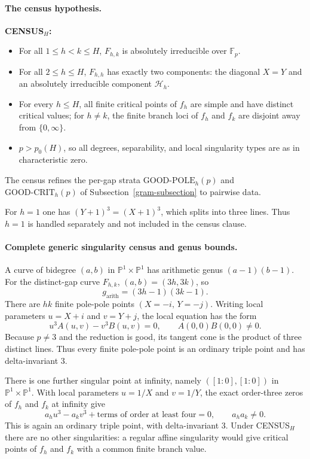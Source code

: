 \paragraph{The census hypothesis.}
\textbf{CENSUS$_H$:}
\begin{itemize}
\item For all $1\le h<k\le H$, $F_{h,k}$ is absolutely irreducible over
$\mathbb F_p$.
\item For all $2\le h\le H$, $F_{h,h}$ has exactly two components:
the diagonal $X=Y$ and an absolutely irreducible component
$\mathcal H_h$.
\item For every $h\le H$, all finite critical points of $f_h$ are
simple and have distinct critical values; for $h\ne k$, the finite
branch loci of $f_h$ and $f_k$ are disjoint away from $\{0,\infty\}$.
\item $p>p_0(H)$, so all degrees, separability, and local singularity
types are as in characteristic zero.
\end{itemize}
The census refines the per-gap strata
$\mathrm{GOOD\mbox{-}POLE}_h(p)$ and
$\mathrm{GOOD\mbox{-}CRIT}_h(p)$ of
Subsection~\ref{gram-subsection} to pairwise data.

\begin{remark}[the $h=1$ exception]\label{rem:p16-h1}
For $h=1$ one has $(Y+1)^3=(X+1)^3$, which splits into three lines.
Thus $h=1$ is handled separately and not included in the census
clause.
\end{remark}

\paragraph{Complete generic singularity census and genus bounds.}
A curve of bidegree $(a,b)$ in $\mathbb P^1\times\mathbb P^1$ has
arithmetic genus $(a-1)(b-1)$.  For the distinct-gap curve $F_{h,k}$,
$(a,b)=(3h,3k)$, so
\[
 g_{\mathrm{arith}}=(3h-1)(3k-1).
\]
There are $hk$ finite pole-pole points $(X=-i,\,Y=-j)$.  Writing local
parameters $u=X+i$ and $v=Y+j$, the local equation has the form
\[
 u^3A(u,v)-v^3B(u,v)=0,
 \qquad A(0,0)B(0,0)\ne0.
\]
Because $p\ne3$ and the reduction is good, its tangent cone is the
product of three distinct lines.  Thus every finite pole-pole point is
an ordinary triple point and has delta-invariant $3$.

There is one further singular point at infinity, namely
$([1:0],[1:0])$ in $\mathbb P^1\times\mathbb P^1$.  With local
parameters $u=1/X$ and $v=1/Y$, the exact order-three zeros of $f_h$
and $f_k$ at infinity give
\[
 a_hu^3-a_kv^3+\text{terms of order at least four}=0,
 \qquad a_ha_k\ne0.
\]
This is again an ordinary triple point, with delta-invariant $3$.
Under CENSUS$_H$ there are no other singularities: a regular affine
singularity would give critical points of $f_h$ and $f_k$ with a
common finite branch value.

